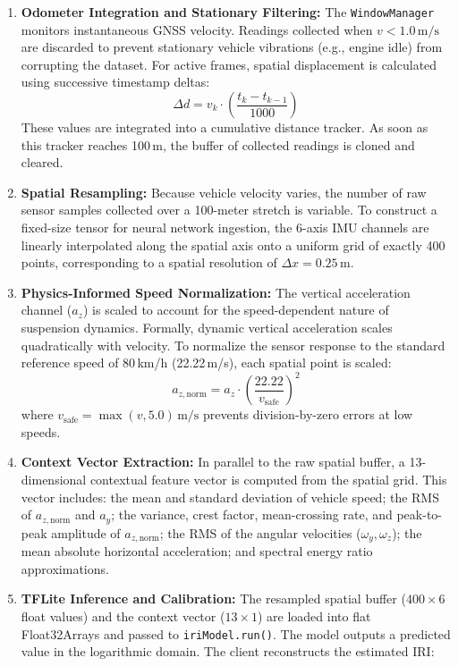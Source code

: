 \documentclass[conference]{IEEEtran}
\begin{document}
\begin{enumerate}
    \item \textbf{Odometer Integration and Stationary Filtering:} The \texttt{WindowManager} monitors instantaneous GNSS velocity. Readings collected when $v < 1.0\,\text{m/s}$ are discarded to prevent stationary vehicle vibrations (e.g., engine idle) from corrupting the dataset. For active frames, spatial displacement is calculated using successive timestamp deltas:
    \begin{equation}
    \Delta d = v_k \cdot \left( \frac{t_k - t_{k-1}}{1000} \right)
    \end{equation}
    These values are integrated into a cumulative distance tracker. As soon as this tracker reaches 100\,m, the buffer of collected readings is cloned and cleared.
    \item \textbf{Spatial Resampling:} Because vehicle velocity varies, the number of raw sensor samples collected over a 100-meter stretch is variable. To construct a fixed-size tensor for neural network ingestion, the 6-axis IMU channels are linearly interpolated along the spatial axis onto a uniform grid of exactly 400 points, corresponding to a spatial resolution of $\Delta x = 0.25\,\text{m}$.
    \item \textbf{Physics-Informed Speed Normalization:} The vertical acceleration channel ($a_z$) is scaled to account for the speed-dependent nature of suspension dynamics. Formally, dynamic vertical acceleration scales quadratically with velocity. To normalize the sensor response to the standard reference speed of 80\,km/h (22.22\,m/s), each spatial point is scaled:
    \begin{equation}
    a_{z,\text{norm}} = a_z \cdot \left( \frac{22.22}{v_{\text{safe}}} \right)^2
    \end{equation}
    where $v_{\text{safe}} = \max(v, 5.0)\,\text{m/s}$ prevents division-by-zero errors at low speeds.
    \item \textbf{Context Vector Extraction:} In parallel to the raw spatial buffer, a 13-dimensional contextual feature vector is computed from the spatial grid. This vector includes: the mean and standard deviation of vehicle speed; the RMS of $a_{z,\text{norm}}$ and $a_y$; the variance, crest factor, mean-crossing rate, and peak-to-peak amplitude of $a_{z,\text{norm}}$; the RMS of the angular velocities ($\omega_y, \omega_z$); the mean absolute horizontal acceleration; and spectral energy ratio approximations.
    \item \textbf{TFLite Inference and Calibration:} The resampled spatial buffer ($400 \times 6$ float values) and the context vector ($13 \times 1$) are loaded into flat Float32Arrays and passed to \texttt{iriModel.run()}. The model outputs a predicted value in the logarithmic domain. The client reconstructs the estimated IRI:

\end{enumerate}
\end{document}
